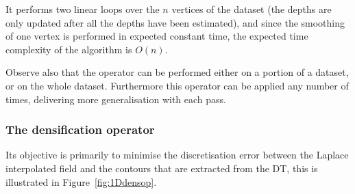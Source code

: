 It performs two linear loops over the $n$ vertices of the dataset (the depths are only updated after all the depths have been estimated), and since the smoothing of one vertex is performed in expected constant time, the expected time complexity of the algorithm is $O(n)$.

Observe also that the operator can be performed either on a portion of a dataset, or on the whole dataset. 
Furthermore this operator can be applied any number of times, delivering more generalisation with each pass.


%
\subsubsection{The densification operator}
\label{sec:densification}

Its objective is primarily to minimise the discretisation error between the Laplace interpolated field and the contours that are extracted from the DT, this is illustrated in Figure~\ref{fig:1Ddensop}.
